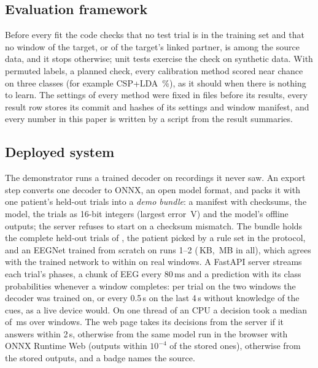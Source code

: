 \subsection{Evaluation framework}
\label{sec:framework}
Before every fit the code checks that no test trial is in the training set and that no window of
the target, or of the target's linked partner, is among the source data, and it stops otherwise;
unit tests exercise the check on synthetic data. With permuted labels, a planned check, every
calibration method scored near chance on three classes (for example CSP+LDA
\rqTwoNoSignalRestAhSfCspLda\,\%), as it should when there is nothing to learn. The settings of
every method were fixed in files before its results, every result row stores its commit and
hashes of its settings and window manifest, and every number in this paper is written by a script
from the result summaries.

\subsection{Deployed system}
\label{sec:system}
The demonstrator runs a trained decoder on recordings it never saw. An export step converts one
decoder to ONNX, an open model format, and packs it with one patient's held-out trials into a
\emph{demo bundle}: a manifest with checksums, the model, the trials as 16-bit integers (largest
error \demoQuantisationUv\,\textmu V) and the model's offline outputs; the server refuses to
start on a checksum mismatch. The bundle holds the \demoTrials{} complete held-out trials of
\demoSubject, the patient picked by a rule set in the protocol, and an EEGNet trained from scratch
on runs 1--2 (\demoModelKb\,KB, \demoBundleMb\,MB in all), which agrees with the trained network
to within \demoParityReal{} on real windows. A FastAPI server streams each trial's phases, a
chunk of EEG every 80\,ms and a prediction with its class probabilities whenever a window
completes: per trial on the two windows the decoder was trained on, or every 0.5\,s on the last
4\,s without knowledge of the cues, as a live device would. On one thread of an
\demoInferenceMachine{} CPU a decision took a median of \demoInferenceMedianMs\,ms over
\demoInferenceN{} windows. The web page takes its decisions from the server if it answers within
2\,s, otherwise from the same model run in the browser with ONNX Runtime Web (outputs within
$10^{-4}$ of the stored ones), otherwise from the stored outputs, and a badge names the source.

